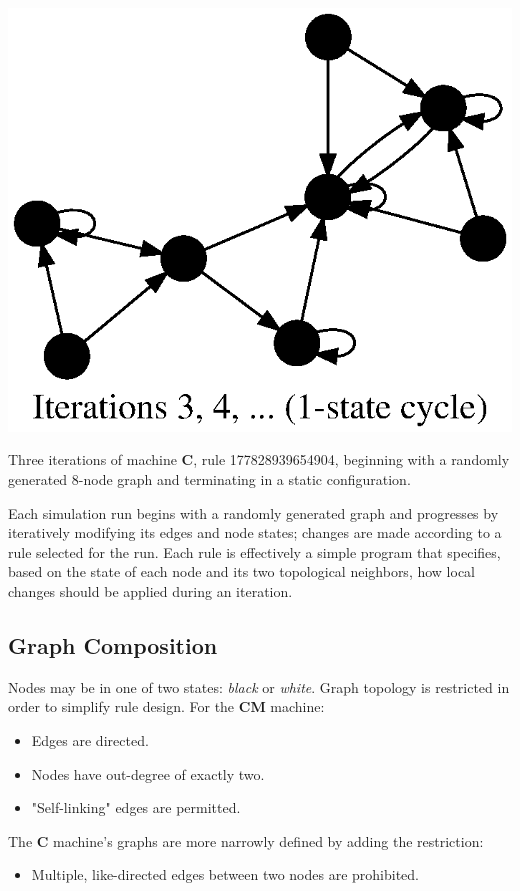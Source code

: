 \documentclass{tufte-handout}
\begin{document}
\begin{marginfigure}
\includegraphics{5iters_3.ps}
\caption{Three iterations of machine \textbf{C}, rule 177828939654904,
beginning with a randomly generated 8-node graph and terminating in a
static configuration.}
\end{marginfigure}

Each simulation run begins with a randomly generated graph and progresses by
iteratively modifying its edges and node states; changes are made according to a rule selected
for the run. Each rule is effectively a simple program  that specifies, based on the state
of each node and its two topological neighbors, how local changes should be applied during an
iteration.

\subsection{Graph Composition}

Nodes may be in one of two states: \textit{black} or \textit{white}.
Graph topology is restricted in order to simplify rule design. For the
\textbf{CM} machine:

\vspace{1mm}
\begin{itemize}
\setlength{\itemindent}{2em}
    \item Edges are directed.
    \item Nodes have out-degree of exactly two.
    \item "Self-linking" edges are permitted.
\end{itemize}
\vspace{2mm}
The \textbf{C}  machine's graphs are more narrowly defined by adding the
restriction:
\begin{itemize} 
\setlength{\itemindent}{2em}
    \item Multiple, like-directed edges between two nodes are prohibited.
\end{itemize}
\vspace{2mm}
\end{document}
